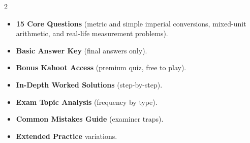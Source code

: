 \documentclass[11pt,a4paper]{article}
\newcommand{\FullReleaseDate}{April 30, 2026}
\begin{document}
\vspace{8pt}

\begin{multicols}{2}
  \begin{tcolorbox}[card, title=\sffamily\bfseries\textcolor{white}{\faHandPointDown\ TODAY (Simplified Version)}, colbacktitle=mainblue, boxed title style={sharp corners, boxrule=0pt}]
    \begin{itemize}[leftmargin=1.2em, itemsep=2pt]
      \item \small \textbf{15 Core Questions} (metric and simple imperial conversions, mixed-unit arithmetic, and real-life measurement problems).
      \item \small \textbf{Basic Answer Key} (final answers only).
      \item \small \textbf{Bonus Kahoot Access} (premium quiz, free to play).
    \end{itemize}
  \end{tcolorbox}

  \columnbreak

  \begin{tcolorbox}[card, title=\sffamily\bfseries\textcolor{white}{\faRocket\ ON \FullReleaseDate\ (Full Upgrade)}, colbacktitle=mainblue, boxed title style={sharp corners, boxrule=0pt}]
    \begin{itemize}[leftmargin=1.2em, itemsep=2pt]
      \item \small \textbf{In-Depth Worked Solutions} (step-by-step).
      \item \small \textbf{Exam Topic Analysis} (frequency by type).
      \item \small \textbf{Common Mistakes Guide} (examiner traps).
      \item \small \textbf{Extended Practice} variations.
    \end{itemize}
  \end{tcolorbox}
\end{multicols}
\end{document}

